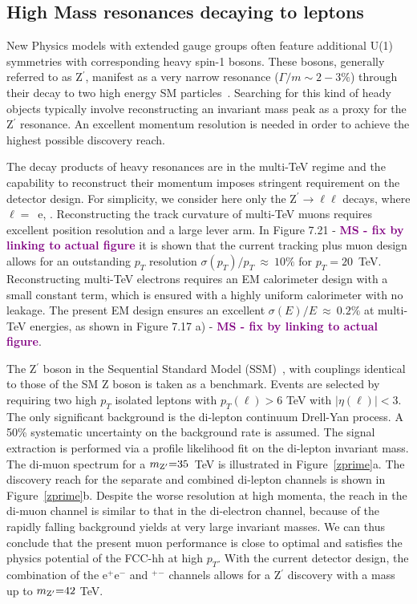 \documentclass[11pt,twoside,a4paper]{cernrep}
\newcommand{\MS}[1]{\textbf{\textcolor{purple}{MS - #1}}}
\begin{document}
\subsection{High Mass resonances decaying to leptons}

New Physics models with extended gauge groups often feature additional U(1) symmetries with corresponding heavy spin-1 bosons. These bosons, generally referred to as Z$^{\prime}$, manifest as a very narrow resonance \mbox{($\Gamma/m \sim 2-3\%$)} through their decay to two high energy SM particles~\cite{London:1986jz,Joglekar:2016yap,Langacker:2008yv,Salvioni:2009mt}. Searching for this kind of heady objects typically involve reconstructing an invariant mass peak as a proxy for the Z$^{\prime}$ resonance. An excellent momentum resolution is needed in order to achieve the highest possible discovery reach.

The decay products of heavy resonances are in the multi-TeV regime and the capability to reconstruct their momentum imposes stringent requirement on the detector design. For simplicity, we consider here only the Z$^{\prime}\rightarrow \ell\ell$ decays, where $\ell=$~e, \textmu.
Reconstructing the track curvature of multi-TeV muons requires excellent position resolution and a large lever arm. In Figure 7.21  - \MS{fix by linking to actual figure} it is shown that the current tracking plus muon design allows for an outstanding $p_T$ resolution $\sigma(p_T)/p_T~\approx~10\%$ for $p_T=20$~TeV. Reconstructing multi-TeV electrons requires an EM calorimeter design with a small constant term, which is ensured with a highly uniform calorimeter with no leakage. The present EM design ensures an excellent $\sigma(E)/E~\approx~0.2\%$ at multi-TeV energies, as shown in Figure 7.17 a) - \MS{fix by linking to actual figure}.

The Z$^{\prime}$ boson in the Sequential Standard Model (SSM)~\cite{Langacker:2008yv}, with couplings identical to those of the SM Z boson is taken as a benchmark. Events are selected by requiring two high $p_{T}$ isolated leptons with $p_T(\ell)>6$ TeV with $|\eta(\ell)|<3$. The only significant background is the di-lepton continuum Drell-Yan process. A 50\% systematic uncertainty on the background rate is assumed. The signal extraction is performed via a profile likelihood fit on the di-lepton invariant mass. The di-muon spectrum for a $m_{\rm Z^{\prime}} {=} 35$~TeV is illustrated in Figure~\ref{zprime}a. The discovery reach for the separate and combined di-lepton channels is shown in Figure~\ref{zprime}b.
Despite the worse resolution at high momenta, the reach in the di-muon channel is similar to that in the di-electron channel, because of the rapidly falling background yields at very large invariant masses. We can thus conclude that the present muon performance is close to optimal and satisfies the physics potential of the FCC-hh at high $p_T$. With the current detector design, the combination of the e$^+$e$^-$ and \textmu$^+$\textmu$^-$ channels allows for a Z$^{\prime}$ discovery with a mass up to $m_{\rm Z^{\prime}} {=} 42$ TeV.
\end{document}
